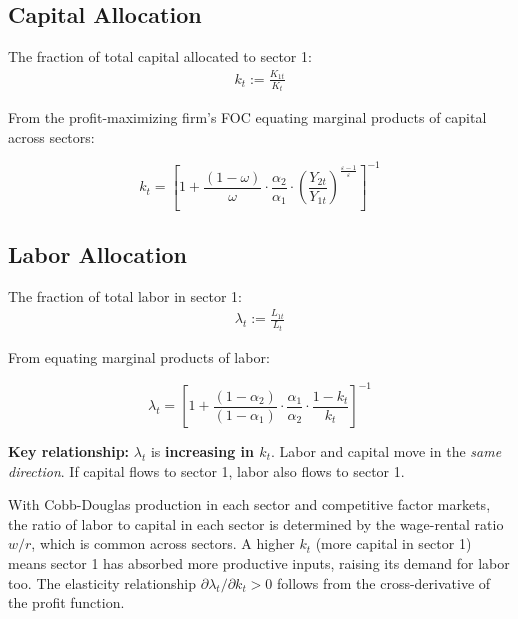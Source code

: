 \documentclass[a4paper,11pt]{article}
\begin{document}
\subsection*{Capital Allocation}

The fraction of total capital allocated to sector 1:
\begin{align*}
k_t := \frac{K_{1t}}{K_t}
\tag{Capital Share}
\end{align*}

From the profit-maximizing firm's FOC equating marginal products of capital across sectors:

\begin{keyformulabox}[title={Capital Allocation Fraction}]
\[
k_t = \left[1 + \frac{(1-\omega)}{\omega} \cdot \frac{\alpha_2}{\alpha_1} \cdot \left(\frac{Y_{2t}}{Y_{1t}}\right)^{\!\frac{\varepsilon-1}{\varepsilon}}\right]^{-1}
\]
\end{keyformulabox}

\subsection*{Labor Allocation}

The fraction of total labor in sector 1:
\begin{align*}
\lambda_t := \frac{L_{1t}}{L_t}
\tag{Labor Share}
\end{align*}

From equating marginal products of labor:

\begin{keyformulabox}[title={Labor Allocation Fraction}]
\[
\lambda_t = \left[1 + \frac{(1-\alpha_2)}{(1-\alpha_1)} \cdot \frac{\alpha_1}{\alpha_2} \cdot \frac{1 - k_t}{k_t}\right]^{-1}
\]
\end{keyformulabox}

\textbf{Key relationship:} $\lambda_t$ is \textbf{increasing in $k_t$}. Labor and capital move in the \emph{same direction}. If capital flows to sector 1, labor also flows to sector 1.

\begin{derivationbox}[title={Why Labor and Capital Move Together}]
With Cobb-Douglas production in each sector and competitive factor markets, the ratio of labor to capital in each sector is determined by the wage-rental ratio $w/r$, which is common across sectors. A higher $k_t$ (more capital in sector 1) means sector 1 has absorbed more productive inputs, raising its demand for labor too. The elasticity relationship $\partial \lambda_t / \partial k_t > 0$ follows from the cross-derivative of the profit function.
\end{derivationbox}
\end{document}
